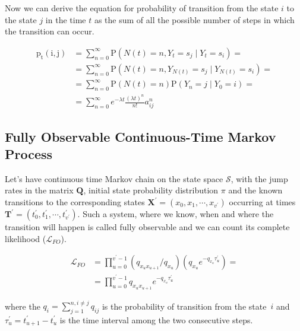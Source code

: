 \documentclass[thesis=M,english]{FITthesis}[2012/10/20]
\newcommand{\matr}[1]{\mathbf{#1}}
\begin{document}
Now we can derive the equation for probability of transition from the state $i$ to the state $j$ in the time $t$ as the sum of all the possible number of steps in which the transition can occur. 

\begin{equation}
\begin{aligned}
\mathrm{p_t(i,j)} &= \sum_{n=0}^{\infty} \mathrm{P}( N(t) = n, Y_t = s_j \mid Y_t = s_i )  = \\
                  &= \sum_{n=0}^{\infty} \mathrm{P}( N(t) = n, Y_{N(t)} = s_j \mid Y_{N(t)} = s_i )  = \\
                  &= \sum_{n=0}^{\infty} \mathrm{P}( N(t) = n ) \mathrm{P}( Y_n = j \mid Y_0 = i )  = \\
				  &= \sum_{n=0}^{\infty} e^{-\lambda t} \frac{ (\lambda t)^n}{n!} a_{ij}^n  
\end{aligned}
\end{equation} 



\subsection{ Fully Observable Continuous-Time Markov Process }

Let's have continuous time Markov chain on the state space $\mathcal{S}$, with the jump rates in the matrix $\matr{Q}$, initial state probability distribution $\pi$ and the known transitions to the corresponding states $\matr{X^{'}}= ( x_0, x_1, \cdots, x_{v^{'}} ) $ occurring at times $\matr{T^{'}} = ( t_0^{'}, t_1^{'}, \cdots, t_{v^{'}}^{'} )$. Such a system, where we know, when and where the transition will happen is called fully observable and we can count its complete likelihood ($\mathcal{L}_{FO}$). 

\begin{equation}\label{eq:CL1}
\begin{aligned}  
 \mathcal{L}_{FO} &=  \prod_{u=0}^{v^{'}-1} ( q_{x_u x_{u+1}} / q_{x_u} )( q_{x_u} e^{ - q_{x_u} \tau_{u }^{'}}) = \\
    &= \prod_{u=0}^{v^{'}-1} q_{x_u x_{u+1}} e^{ - q_{x_u} \tau_{u}^{'}}
\end{aligned}
\end{equation}

where the $q_i = \sum_{j=1}^{n,i\neq j} q_{ij}$ is the probability of transition from the state~$i$ and   
$\tau_{u}^{'} = t_{u+1}^{'} - t_{u}^{'}$ is the time interval among the two consecutive steps.
\end{document}
